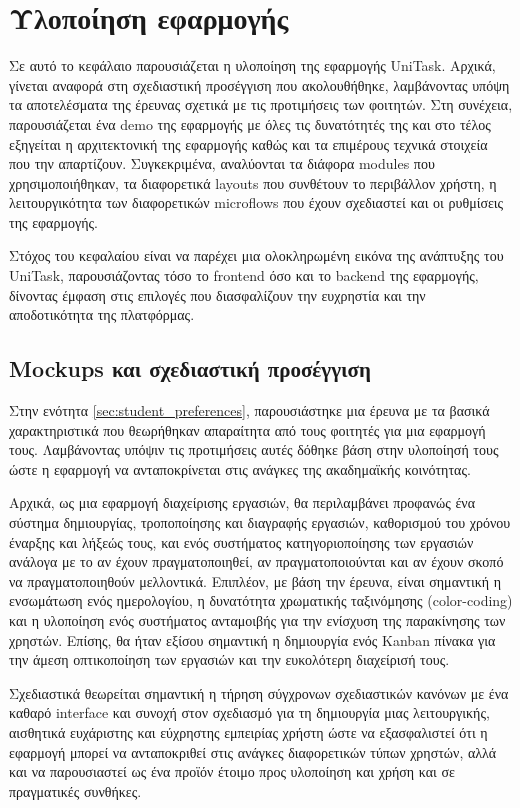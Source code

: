 \chapter{Υλοποίηση εφαρμογής} \label{ch:unitask}
    Σε αυτό το κεφάλαιο παρουσιάζεται η υλοποίηση της εφαρμογής UniTask.  Αρχικά, γίνεται αναφορά στη σχεδιαστική προσέγγιση που ακολουθήθηκε, λαμβάνοντας υπόψη τα αποτελέσματα της έρευνας σχετικά με τις προτιμήσεις των φοιτητών. Στη συνέχεια, παρουσιάζεται ένα demo της εφαρμογής με όλες τις δυνατότητές της και στο τέλος εξηγείται η αρχιτεκτονική της εφαρμογής καθώς και τα επιμέρους τεχνικά
    στοιχεία που την απαρτίζουν. Συγκεκριμένα, αναλύονται τα διάφορα modules που χρησιμοποιήθηκαν, τα διαφορετικά layouts που συνθέτουν το περιβάλλον χρήστη, η λειτουργικότητα των διαφορετικών microflows που έχουν σχεδιαστεί και οι ρυθμίσεις της εφαρμογής.

    Στόχος του κεφαλαίου είναι να παρέχει μια ολοκληρωμένη εικόνα της ανάπτυξης του UniTask, παρουσιάζοντας τόσο το frontend όσο και το backend της εφαρμογής, δίνοντας έμφαση στις επιλογές που διασφαλίζουν την ευχρηστία και την αποδοτικότητα της πλατφόρμας.

    \section{Mockups και σχεδιαστική προσέγγιση}
        Στην ενότητα \ref{sec:student_preferences}, παρουσιάστηκε μια έρευνα με τα βασικά χαρακτηριστικά που θεωρήθηκαν απαραίτητα από τους φοιτητές για μια εφαρμογή τους. Λαμβάνοντας υπόψιν τις προτιμήσεις αυτές δόθηκε βάση στην υλοποίησή τους ώστε η εφαρμογή να ανταποκρίνεται στις ανάγκες της ακαδημαϊκής κοινότητας.

        Αρχικά, ως μια εφαρμογή διαχείρισης εργασιών, θα περιλαμβάνει προφανώς ένα σύστημα δημιουργίας, τροποποίησης και διαγραφής εργασιών, καθορισμού του χρόνου έναρξης και λήξεώς τους, και ενός συστήματος κατηγοριοποίησης των εργασιών ανάλογα με το αν έχουν πραγματοποιηθεί, αν πραγματοποιούνται και αν έχουν σκοπό να πραγματοποιηθούν μελλοντικά. Επιπλέον, με βάση την έρευνα, είναι σημαντική η ενσωμάτωση ενός ημερολογίου, η δυνατότητα χρωματικής ταξινόμησης (color-coding) και η υλοποίηση ενός συστήματος ανταμοιβής για την ενίσχυση της παρακίνησης των χρηστών. Επίσης, θα ήταν εξίσου σημαντική η δημιουργία ενός Kanban πίνακα για την άμεση οπτικοποίηση των εργασιών και την ευκολότερη διαχείρισή τους.

        Σχεδιαστικά θεωρείται σημαντική η τήρηση σύγχρονων σχεδιαστικών κανόνων με ένα καθαρό interface και συνοχή στον σχεδιασμό για τη δημιουργία μιας λειτουργικής, αισθητικά ευχάριστης και εύχρηστης εμπειρίας χρήστη ώστε να εξασφαλιστεί ότι η εφαρμογή μπορεί να ανταποκριθεί στις ανάγκες διαφορετικών τύπων χρηστών, αλλά και να παρουσιαστεί ως ένα προϊόν έτοιμο προς υλοποίηση και χρήση και σε πραγματικές συνθήκες.


